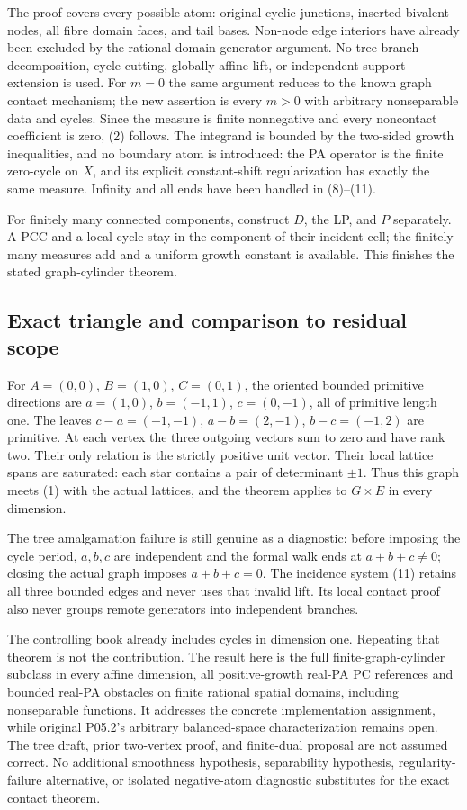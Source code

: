 \documentclass[
  11pt,
]{article}
\begin{document}
The proof covers every possible atom: original cyclic junctions,
inserted bivalent nodes, all fibre domain faces, and tail bases.
Non-node edge interiors have already been excluded by the
rational-domain generator argument. No tree branch decomposition, cycle
cutting, globally affine lift, or independent support extension is used.
For \(m=0\) the same argument reduces to the known graph contact
mechanism; the new assertion is every \(m>0\) with arbitrary
nonseparable data and cycles. Since the measure is finite nonnegative
and every noncontact coefficient is zero, (2) follows. The integrand is
bounded by the two-sided growth inequalities, and no boundary atom is
introduced: the PA operator is the finite zero-cycle on \(X\), and its
explicit constant-shift regularization has exactly the same measure.
Infinity and all ends have been handled in (8)--(11).

For finitely many connected components, construct \(D\), the LP, and
\(P\) separately. A PCC and a local cycle stay in the component of their
incident cell; the finitely many measures add and a uniform growth
constant is available. This finishes the stated graph-cylinder theorem.

\subsection{Exact triangle and comparison to residual
scope}\label{exact-triangle-and-comparison-to-residual-scope}

For \(A=(0,0)\), \(B=(1,0)\), \(C=(0,1)\), the oriented bounded
primitive directions are \(a=(1,0)\), \(b=(-1,1)\), \(c=(0,-1)\), all of
primitive length one. The leaves \(c-a=(-1,-1)\), \(a-b=(2,-1)\),
\(b-c=(-1,2)\) are primitive. At each vertex the three outgoing vectors
sum to zero and have rank two. Their only relation is the strictly
positive unit vector. Their local lattice spans are saturated: each star
contains a pair of determinant \(\pm1\). Thus this graph meets (1) with
the actual lattices, and the theorem applies to \(G\times E\) in every
dimension.

The tree amalgamation failure is still genuine as a diagnostic: before
imposing the cycle period, \(a,b,c\) are independent and the formal walk
ends at \(a+b+c\ne0\); closing the actual graph imposes \(a+b+c=0\). The
incidence system (11) retains all three bounded edges and never uses
that invalid lift. Its local contact proof also never groups remote
generators into independent branches.

The controlling book already includes cycles in dimension one. Repeating
that theorem is not the contribution. The result here is the full
finite-graph-cylinder subclass in every affine dimension, all
positive-growth real-PA PC references and bounded real-PA obstacles on
finite rational spatial domains, including nonseparable functions. It
addresses the concrete implementation assignment, while original P05.2's
arbitrary balanced-space characterization remains open. The tree draft,
prior two-vertex proof, and finite-dual proposal are not assumed
correct. No additional smoothness hypothesis, separability hypothesis,
regularity-failure alternative, or isolated negative-atom diagnostic
substitutes for the exact contact theorem.
\end{document}
